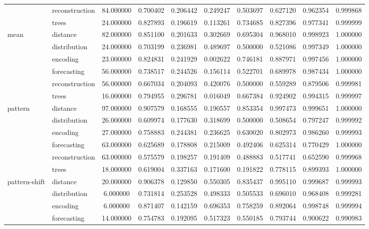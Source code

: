 \begin{tabular}{|l|l|c|c|c|c|c|c|c|c|}
 & reconstruction & 84.000000 & 0.700402 & 0.206442 & 0.249247 & 0.503697 & 0.627120 & 0.962354 & 0.999868 \\
 & trees & 24.000000 & 0.827893 & 0.196619 & 0.113261 & 0.734685 & 0.827396 & 0.977341 & 0.999999 \\
\cline{1-10}
\multirow[t]{6}{*}{mean} & distance & 82.000000 & 0.851100 & 0.201633 & 0.302669 & 0.695304 & 0.968010 & 0.998923 & 1.000000 \\
 & distribution & 24.000000 & 0.703199 & 0.236981 & 0.489697 & 0.500000 & 0.521086 & 0.997349 & 1.000000 \\
 & encoding & 23.000000 & 0.824831 & 0.241929 & 0.002622 & 0.746181 & 0.887971 & 0.997456 & 1.000000 \\
 & forecasting & 56.000000 & 0.738517 & 0.244526 & 0.156114 & 0.522701 & 0.689978 & 0.987434 & 1.000000 \\
 & reconstruction & 56.000000 & 0.667034 & 0.204093 & 0.420076 & 0.500000 & 0.559289 & 0.879506 & 0.999981 \\
 & trees & 16.000000 & 0.794955 & 0.296781 & 0.016049 & 0.667384 & 0.924902 & 0.994315 & 0.999997 \\
\cline{1-10}
\multirow[t]{6}{*}{pattern} & distance & 97.000000 & 0.907579 & 0.168555 & 0.190557 & 0.853354 & 0.997473 & 0.999651 & 1.000000 \\
 & distribution & 26.000000 & 0.609974 & 0.177630 & 0.318699 & 0.500000 & 0.508654 & 0.797247 & 0.999992 \\
 & encoding & 27.000000 & 0.758883 & 0.244381 & 0.236625 & 0.630020 & 0.802973 & 0.986260 & 0.999993 \\
 & forecasting & 63.000000 & 0.625689 & 0.178808 & 0.215009 & 0.492406 & 0.625314 & 0.770429 & 1.000000 \\
 & reconstruction & 63.000000 & 0.575579 & 0.198257 & 0.191409 & 0.488883 & 0.517741 & 0.652590 & 0.999968 \\
 & trees & 18.000000 & 0.619004 & 0.337163 & 0.171600 & 0.191822 & 0.778115 & 0.899393 & 1.000000 \\
\cline{1-10}
\multirow[t]{6}{*}{pattern-shift} & distance & 20.000000 & 0.906378 & 0.129850 & 0.550305 & 0.835437 & 0.995110 & 0.999687 & 0.999993 \\
 & distribution & 6.000000 & 0.731814 & 0.253528 & 0.498333 & 0.505533 & 0.696010 & 0.968408 & 0.999281 \\
 & encoding & 6.000000 & 0.871407 & 0.142159 & 0.696353 & 0.758259 & 0.892064 & 0.998748 & 0.999994 \\
 & forecasting & 14.000000 & 0.754783 & 0.192095 & 0.517323 & 0.550185 & 0.793744 & 0.900622 & 0.990983 \\

\end{tabular}
